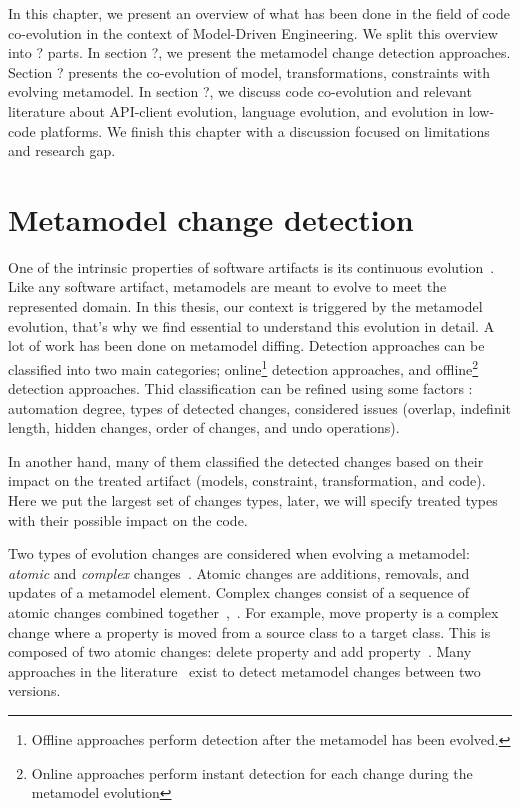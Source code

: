In this chapter, we present an overview of what has been done in the field of code co-evolution in the context of Model-Driven Engineering. We split this overview into ? parts. In section ?, we present the metamodel change detection approaches. Section ? presents the co-evolution of model, transformations, constraints with evolving metamodel. In section ?, we discuss code co-evolution and relevant literature about API-client evolution, language evolution, and evolution in low-code platforms. We finish this chapter with a discussion focused on limitations and research gap.
 \section{Metamodel change detection}
 One of the intrinsic properties of software artifacts is its continuous evolution~\cite{mens2008introduction}. Like any software artifact, metamodels are meant to evolve to meet the represented domain. %
 In this thesis, our context is triggered by the metamodel evolution, that's why we find essential to understand this evolution in detail.
 A lot of work has been done on metamodel diffing.
 Detection approaches can be classified into two main categories; online\footnote{Offline approaches perform detection after the metamodel has been evolved.} detection approaches, and offline\footnote{Online approaches perform instant detection for each change during the metamodel evolution} detection approaches. Thid classification can be refined using some factors : automation degree, types of detected changes, considered issues (overlap, indefinit length, hidden changes, order of changes, and undo operations)\cite{hebig2016approaches}.
 
 
 
  In another hand, many of them classified the detected changes based on their impact on the treated artifact (models, constraint, transformation, and code). Here we put the largest set of changes types, later, we will specify treated types with their possible impact on the code.
 
 
 Two types of evolution changes are considered when evolving a metamodel: \emph{atomic} and \emph{complex} changes~\cite{hebig2016approaches,Herrmannsdoerfer2011}. 
 Atomic changes are additions, removals, and updates of a metamodel element. Complex changes consist of a sequence of atomic changes combined together~\cite{vermolen_reconstructing_2012},~\cite{khelladi2015detecting}. For example, move property is a complex change where a property is moved from a source class to a target class. This is composed of two atomic changes: delete property and add property~\cite{Herrmannsdoerfer2011}. 
 Many approaches in the literature~\cite{Alter2015, williams2012searching,cicchetti_managing_2009,langer_posteriori_2013,vermolen_reconstructing_2012,Khelladi2016,bettini2022executable} exist to detect metamodel changes between two versions.
  
